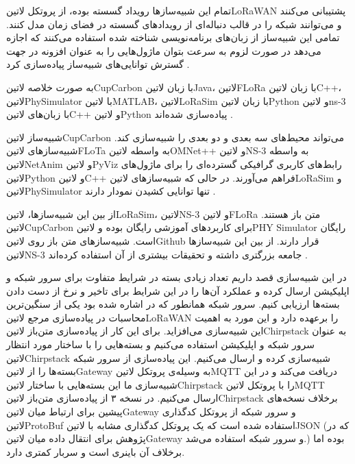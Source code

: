 تمام این شبیه‌سازها رویداد گسسته بوده، از پروتکل ‌لاتین{LoRaWAN} پشتیبانی می‌کنند و می‌توانند شبکه را در قالب
دنباله‌ای از رویدادهای گسسته در فضای زمان مدل کنند.
تمامی این شبیه‌ساز از زبان‌های برنامه‌نویسی شناخته شده استفاده می‌کنند که اجازه می‌دهد در صورت لزوم به سرعت بتوان
ماژول‌هایی را به عنوان افزونه در جهت گسترش توانایی‌های شبیه‌ساز پیاده‌سازی کرد
.

به صورت خلاصه ‌لاتین{CupCarbon} با زبان ‌لاتین{Java}، ‌لاتین{FLoRa} با زبان ‌لاتین{C++}،
‌لاتین{PhySimulator} با ‌لاتین{MATLAB}، ‌لاتین{LoRaSim} با زبان ‌لاتین{Python}
و ‌لاتین{ns-3} با زبان‌های ‌لاتین{C++} و ‌لاتین{Python} پیاده‌سازی شده‌اند
.

شبیه‌ساز ‌لاتین{CupCarbon} می‌تواند محیط‌های سه بعدی و دو بعدی را شبیه‌سازی کند.
شبیه‌سازهای ‌لاتین{FLoTa} به واسطه ‌لاتین{OMNet++} و ‌لاتین{NS-3} به واسطه
‌لاتین{NetAnim} و ‌لاتین{PyViz} رابط‌های کاربری گرافیکی گسترده‌ای را برای ماژول‌های ‌لاتین{Python}
و ‌لاتین{C++} فراهم می‌آورند.
در حالی که شبیه‌سازهای ‌لاتین{LoRaSim} و ‌لاتین{PhySimulator} تنها توانایی کشیدن نمودار دارند
.

از بین این شبیه‌سازها، ‌لاتین{LoRaSim}، ‌لاتین{NS-3} و ‌لاتین{FLoRa} متن باز هستند.
‌لاتین{CupCarbon} برای کاربردهای آموزشی رایگان بوده و ‌لاتین{PHY Simulator} رایگان است.
شبیه‌سازهای متن‌ باز روی ‌لاتین{Github} قرار دارند. از بین این شبیه‌سازها ‌لاتین{NS-3}
جامعه بزرگتری داشته و تحقیقات بیشتری از آن استفاده کرده‌اند
.


در این شبیه‌سازی قصد داریم تعداد زیادی بسته در شرایط متفاوت برای سرور شبکه و اپلیکیشن ارسال کرده و عملکرد آن‌ها را در این شرایط برای تاخیر و نرخ از دست دادن بسته‌ها ارزیابی کنیم.
سرور شبکه همانطور که در  اشاره شده بود یکی از سنگین‌ترین محاسبات در پیاده‌سازی مرجع ‌لاتین{LoRaWAN} را برعهده دارد و این مورد به
اهمیت این شبیه‌سازی می‌افزاید.
برای این کار از پیاده‌سازی متن‌باز ‌لاتین{Chirpstack} به عنوان سرور شبکه و اپلیکیشن استفاده می‌کنیم و بسته‌هایی را با ساختار مورد انتظار
‌لاتین{Chirpstack} شبیه‌سازی کرده و ارسال می‌کنیم.
این پیاده‌سازی از سرور شبکه بسته‌ها را از ‌لاتین{Gateway} به وسیله‌ی پروتکل ‌لاتین{MQTT} دریافت می‌کند و در این شبیه‌سازی ما این بسته‌هایی با ساختار ‌لاتین{Chirpstack}
را با پروتکل ‌لاتین{MQTT} ارسال می‌کنیم.
در نسخه ۳ از پیاده‌سازی متن‌باز ‌لاتین{Chirpstack} برخلاف نسخه‌های پیشین برای ارتباط میان ‌لاتین{Gateway} و سرور شبکه از پروتکل کدگذاری ‌لاتین{ProtoBuf} استفاده شده است که یک پروتکل
کدگذاری مشابه با ‌لاتین{JSON} (که در پژوهش  برای انتقال داده میان ‌لاتین{Gateway} و سرور شبکه استفاده می‌شد.) بوده اما برخلاف آن باینری است و سربار کمتری دارد.


